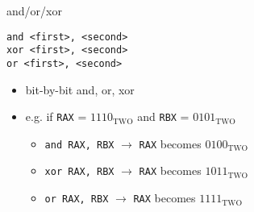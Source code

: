 \begin{frame}[fragile,label=andOrXor]{and/or/xor}
\begin{lstlisting}
and <first>, <second>
xor <first>, <second>
or <first>, <second>
\end{lstlisting}
\begin{itemize}
\item bit-by-bit and, or, xor
\item e.g. if {\tt RAX} = $1110_\text{TWO}$ and {\tt RBX} = $0101_\text{TWO}$
\begin{itemize}
\item \lstinline|and RAX, RBX| $\rightarrow$ {\tt RAX} becomes $0100_\text{TWO}$
\item \lstinline|xor RAX, RBX| $\rightarrow$ {\tt RAX} becomes $1011_\text{TWO}$
\item \lstinline|or RAX, RBX| $\rightarrow$ {\tt RAX} becomes $1111_\text{TWO}$
\end{itemize}
\end{itemize}
\end{frame}
